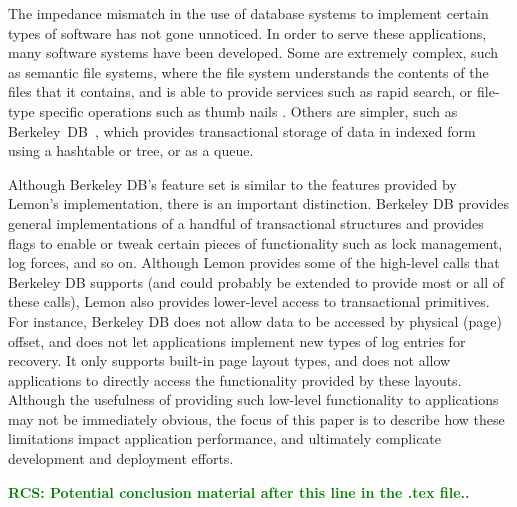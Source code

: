 \documentclass[10pt,letterpaper,twocolumn,english]{article}
\newcommand{\yad}{Lemon\xspace}
\newcommand{\rcs}[1]{\textcolor{green}{\bf RCS: #1}}
\begin{document}
The impedance mismatch in the use of database systems to implement
certain types of software has not gone unnoticed.
%
%
%
In
order to serve these applications, many software systems have been 
developed.  Some are extremely complex, such as semantic file
systems, where the file system understands the contents of the files
that it contains, and is able to provide services such as rapid
search, or file-type specific operations such as thumb nails \cite{Reiser4,WinFS,BeOS,SemanticFSWork,SemanticWeb}.  Others are simpler, such as
Berkeley~DB~\cite{bdb, berkeleyDB}, which provides transactional
storage of data in indexed form using a hashtable or tree, or as a queue.  

Although Berkeley DB's feature set is similar to the features provided by
\yad's implementation, there is an important distinction.  Berkeley DB
provides general implementations of a handful of transactional
structures and provides flags to enable or tweak certain pieces of
functionality such as lock management, log forces, and so on. Although
\yad provides some of the high-level calls that Berkeley DB supports
(and could probably be extended to provide most or all of these calls), \yad
also provides lower-level access to transactional primitives.  For
instance, Berkeley DB does not allow data to be accessed by physical
(page) offset, and does not let applications implement new types of
log entries for recovery.  It only supports built-in page layout types,
and does not allow applications to directly access the functionality
provided by these layouts.  Although the usefulness of providing such
low-level functionality to applications may not be immediately
obvious, the focus of this paper is to describe how these limitations
impact application performance, and ultimately complicate development
and deployment efforts.  

\rcs{Potential conclusion material after this line in the .tex file..}
\end{document}
